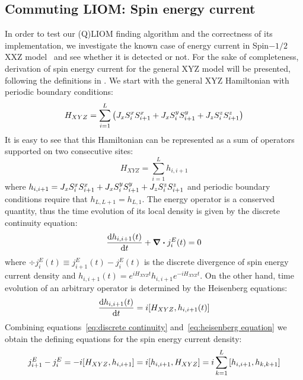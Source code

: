 \subsection{Commuting LIOM: Spin energy current}
In order to test our (Q)LIOM finding algorithm and the correctness of its implementation, we investigate the known case of
energy current in Spin\(-1/2\) XXZ model~\autocite*{Mierzejewski2015Approx} and see whether it is detected or not.
For the sake of completeness, derivation of
spin energy current for the general XYZ model will be presented, following the definitions in \textcite{Zotos1997}.
We start with the general XYZ Hamiltonian with periodic boundary conditions:
\begin{equation}
  H_{XYZ} = \sum_{i=1}^L  \left( J_{x} S^{x}_{i}S^{x}_{i+1} + J_{x} S^{y}_{i}S^{y}_{i+1} + J_{z} S^{z}_{i}S^{z}_{i+1} \right)
\end{equation}
It is easy to see that this Hamiltonian can be represented as a sum of operators supported on two consecutive sites:
\begin{equation}
  H_{XYZ} = \sum_{i=1}^L h_{i,i+1}
\end{equation}
where \(h_{i,i+1} = J_{x} S^{x}_{i}S^{x}_{i+1} + J_{x} S^{y}_{i}S^{y}_{i+1} + J_{z} S^{z}_{i}S^{z}_{i+1} \) and periodic boundary conditions
require that \(h_{L,L+1} = h_{L,1}\). The energy operator is a conserved quantity, thus the time evolution of its local density
is given by the discrete continuity equation:
\begin{equation}
  \dv{h_{i,i+1}(t)}{t} + \div{j_{i}^{E}(t)} = 0
  \label{eq:discrete continuity}
\end{equation}
where \(\div{j_{i}^E(t)} \equiv j_{i+1}^E(t) - j_{i}^E(t)\) is the discrete divergence of spin energy current density and \(h_{i,i+1}(t) = e^{i H_{XYZ}t} h_{i,i+1} e^{-i H_{XYZ} t}\).
On the other hand, time evolution of an arbitrary operator is determined
by the Heisenberg equations:
\begin{equation}
  \dv{h_{i,i+1}(t)}{t} = i \comm{H_{XYZ}}{h_{i,i+1}(t)}
  \label{eq:heisenberg equation}
\end{equation}
Combining equations~\eqref{eq:discrete continuity} and~\eqref{eq:heisenberg equation} we obtain the defining equations for
the spin energy current density:
\begin{equation}
  j_{i+1}^E - j_{i}^E = - i \comm{H_{XYZ}}{h_{i,i+1}} = i \comm{h_{i,i+1}}{H_{XYZ}} = i \sum_{k=1}^L \comm{h_{i,i+1}}{h_{k,k+1}}
  \label{eq:energy current defining equation}
\end{equation}
